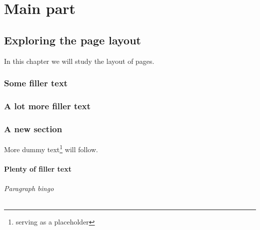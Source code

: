 \documentclass[a4paper,11pt]{book}
\begin{document}
\tableofcontents
\part[Part1]{Main part}
\chapter[Page layout]{Exploring the page layout}
In this chapter we will study the layout of pages.

\section[Filler text]{Some filler text}
\blindtext

\section*{A lot more filler text}
\section[New]{A new section}
More dummy text\footnote{serving as a placeholder} will follow.

\subsection[Plenty]{Plenty of filler text}
\paragraph{Paragraph bingo}
\blindtext[10]
\end{document}
